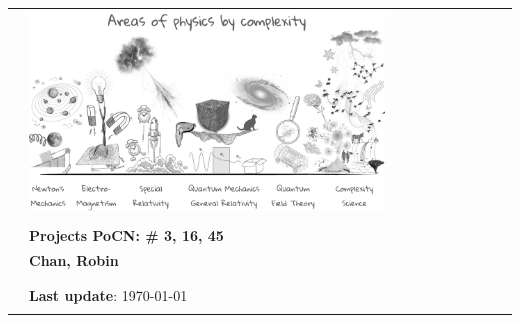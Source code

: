 \begin{center}
\begin{spacing}{1.3}
\begin{tabular}{p{4cm} ll}
&  \includegraphics[width=0.77\textwidth]{images/areas_of_physics.png} \\\\
& \textcolor{unipd}{\textbf{\huge Projects PoCN: \# 3, 16, 45}}\\ %
& \textbf{Chan, Robin}\\
& \\
& \\
& \scriptsize \textbf{Last update}: \today\\\\
\end{tabular}

\end{spacing}

\end{center}



\thispagestyle{empty} %
\clearpage\setcounter{page}{1} %
